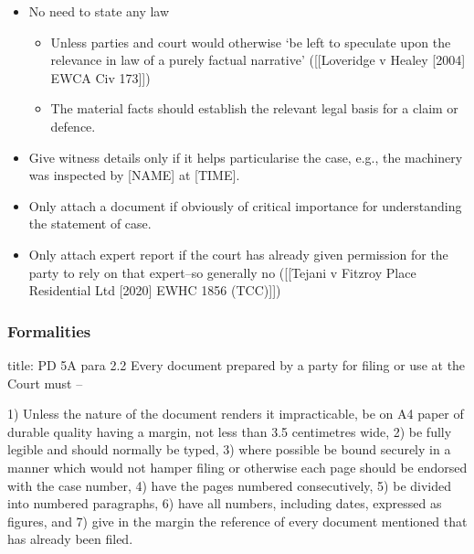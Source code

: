 \documentclass[
]{article}
\newenvironment{Shaded}{}{}
\newcommand{\NormalTok}[1]{#1}
\providecommand{\tightlist}{%
  \setlength{\itemsep}{0pt}\setlength{\parskip}{0pt}}
\begin{document}
\begin{itemize}
\tightlist
\item
  No need to state any law

  \begin{itemize}
  \tightlist
  \item
    Unless parties and court would otherwise `be left to speculate upon
    the relevance in law of a purely factual narrative' ({[}{[}Loveridge
    v Healey {[}2004{]} EWCA Civ 173{]}{]})
  \item
    The material facts should establish the relevant legal basis for a
    claim or defence.
  \end{itemize}
\item
  Give witness details only if it helps particularise the case, e.g.,
  the machinery was inspected by {[}NAME{]} at {[}TIME{]}.
\item
  Only attach a document if obviously of critical importance for
  understanding the statement of case.
\item
  Only attach expert report if the court has already given permission
  for the party to rely on that expert--so generally no ({[}{[}Tejani v
  Fitzroy Place Residential Ltd {[}2020{]} EWHC 1856 (TCC){]}{]})
\end{itemize}

\hypertarget{formalities}{%
\subsubsection{Formalities}\label{formalities}}

\begin{Shaded}
\begin{Highlighting}[]
\NormalTok{title: PD 5A para 2.2}
\NormalTok{Every document prepared by a party for filing or use at the Court must –  }
  
\NormalTok{1) Unless the nature of the document renders it impracticable, be on A4 paper of durable quality having a margin, not less than 3.5 centimetres wide, }
\NormalTok{2) be fully legible and should normally be typed, }
\NormalTok{3) where possible be bound securely in a manner which would not hamper filing or otherwise each page should be endorsed with the case number, }
\NormalTok{4) have the pages numbered consecutively, }
\NormalTok{5) be divided into numbered paragraphs, }
\NormalTok{6) have all numbers, including dates, expressed as figures, and }
\NormalTok{7) give in the margin the reference of every document mentioned that has already been filed.}
\end{Highlighting}
\end{Shaded}
\end{document}

